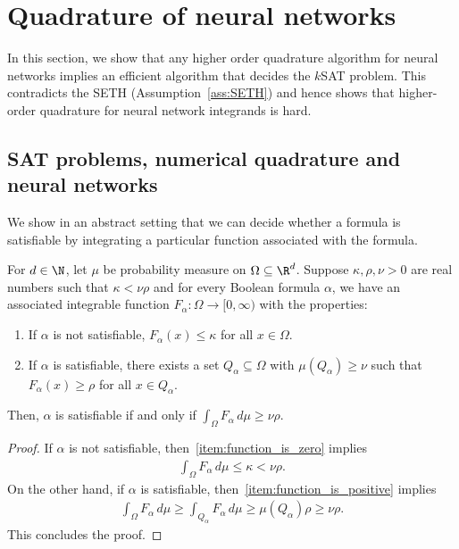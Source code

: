 \documentclass{amsart}[11pt]
\numberwithin{equation}{section}
\numberwithin{theorem}{section}
\begin{document}
\section{Quadrature of neural networks}\label{sec:quad}
In this section, we show that any higher order quadrature algorithm for neural networks implies an efficient algorithm that decides the $k$SAT problem. This contradicts the SETH (Assumption~\ref{ass:SETH}) and hence shows that higher-order quadrature for neural network integrands is hard.

\subsection{SAT problems, numerical quadrature and neural networks}
We show in an abstract setting that we can decide whether a formula is satisfiable by integrating a particular function associated with the formula.

\begin{lemma}\label{lem:quad_to_sat}
    For $d \in \N$, let $\mu$ be probability measure on $\Omega\subseteq \R^d$. Suppose $\kappa, \rho, \nu > 0$ are real numbers such that $\kappa < \nu \rho$ and for every Boolean formula $\alpha$, we have an associated integrable function $F_\alpha: \Omega \to [0, \infty)$ with the properties:
    \begin{enumerate}[label=(\roman*)]
        \item\label{item:function_is_zero} If $\alpha$ is not satisfiable, $F_\alpha(x) \leq \kappa$ for all $x \in \Omega$.
        \item\label{item:function_is_positive} If $\alpha$ is satisfiable, there exists a set $Q_\alpha \subseteq \Omega$ with $\mu(Q_\alpha) \geq \nu$ such that $F_\alpha(x) \geq \rho$ for all $x \in Q_\alpha$.
    \end{enumerate}
    Then, $\alpha$ is satisfiable if and only if $\int_{\Omega} F_\alpha \, d\mu \geq \nu \rho$.
\end{lemma}
\begin{proof}
    If $\alpha$ is not satisfiable, then~\ref{item:function_is_zero} implies
    \begin{align*}
        \int_{\Omega} F_\alpha \, d\mu \leq \kappa < \nu \rho.
    \end{align*}
    On the other hand, if $\alpha$ is satisfiable, then~\ref{item:function_is_positive} implies
    \begin{align*}
        \int_{\Omega} F_\alpha \, d\mu \geq \int_{Q_\alpha} F_\alpha \, d\mu \geq \mu(Q_\alpha) \rho \geq \nu \rho.
    \end{align*}
    This concludes the proof.
\end{proof}
\end{document}
